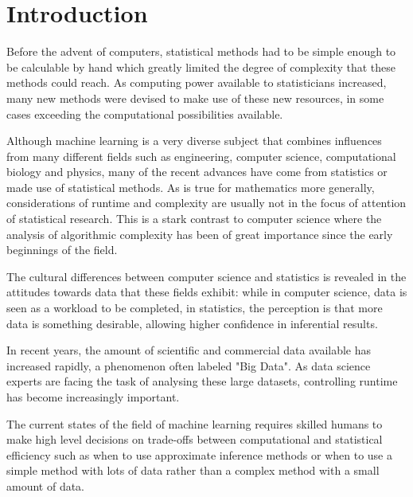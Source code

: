 \documentclass[a4paper,12pt,twoside,openright]{report}
\begin{document}
\pagestyle{empty}
\singlespacing

\onehalfspacing

\singlespacing




\setcounter{page}{0}
\pagestyle{plain}
\tableofcontents
\listoffigures
\listoftables
\listoftodos

\onehalfspacing


\chapter{Introduction}

\setcounter{page}{1}

Before the advent of computers, statistical methods had to be simple enough to be calculable by hand which greatly limited the degree of complexity that these methods could reach. As computing power available to statisticians increased, many new methods were devised to make use of these new resources, in some cases exceeding the computational possibilities available.

Although machine learning is a very diverse subject that combines influences from many different fields such as engineering, computer science, computational biology and physics, many of the recent advances have come from statistics or made use of statistical methods. As is true for mathematics more generally, considerations of runtime and complexity are usually not in the focus of attention of statistical research. This is a stark contrast to computer science where the analysis of algorithmic complexity has been of great importance since the early beginnings of the field.

The cultural differences between computer science and statistics is revealed in the attitudes towards data that these fields exhibit: while in computer science, data is seen as a workload to be completed, in statistics, the perception is that more data is something desirable, allowing higher confidence in inferential results.

In recent years, the amount of scientific and commercial data available has increased rapidly, a phenomenon often labeled "Big Data". As data science experts are facing the task of analysing these large datasets, controlling runtime has become increasingly important.

The current states of the field of machine learning requires skilled humans to make high level decisions on trade-offs between computational and statistical efficiency such as when to use approximate inference methods or when to use a simple method with lots of data rather than a complex method with a small amount of data. 
\end{document}
